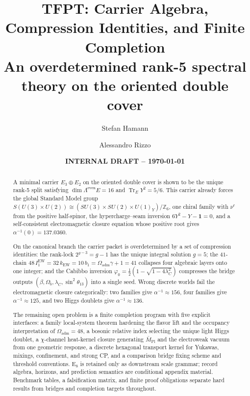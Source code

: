 \documentclass[11pt,a4paper]{article}
\title{%
    \textbf{TFPT: Carrier Algebra, Compression Identities, and Finite Completion}\\[0.5em]
    \Large An overdetermined rank-5 spectral theory on the oriented double cover
}
\author{Stefan Hamann \and Alessandro Rizzo}
\date{\textbf{INTERNAL DRAFT -- \today}}
\theoremstyle{definition}
\theoremstyle{remark}
\DeclareMathOperator{\tr}{Tr}
\begin{document}
\maketitle

\begin{abstract}
A minimal carrier $E_3\oplus E_2$ on the oriented double cover is shown to be the unique rank-5 split satisfying $\dim\Lambda^{\mathrm{even}}E=16$ and $\tr_EY^2=5/6$. This carrier already forces the global Standard Model group $S(U(3)\times U(2))\cong(SU(3)\times SU(2)\times U(1)_Y)/\mathbb Z_6$, one chiral family with $\nu^c$ from the positive half-spinor, the hypercharge--seam inversion $6Y^2-Y-\mathbf 1=0$, and a self-consistent electromagnetic closure equation whose positive root gives $\alpha^{-1}(0)=\num{137.0360}$.

On the canonical branch the carrier packet is overdetermined by a set of compression identities: the rank-lock $2^{g-3}=g-1$ has the unique integral solution $g=5$; the $41$-chain $48\,I_1^{\mathrm{EW}}=32\,k_{\mathrm{EW}}=10\,b_1=\Omega_{\mathrm{adm}}\gamma+1=41$ collapses four algebraic layers onto one integer; and the Cabibbo inversion $\varphi_0=\frac12(1-\sqrt{1-4\lambda_C^2})$ compresses the bridge outputs $(\beta,\Omega_b,\lambda_C,\sin^2\theta_{13})$ into a single seed. Wrong discrete worlds fail the electromagnetic closure categorically: two families give $\alpha^{-1}\approx 156$, four families give $\alpha^{-1}\approx 125$, and two Higgs doublets give $\alpha^{-1}\approx 136$.

The remaining open problem is a finite completion program with five explicit interfaces: a family local-system theorem hardening the flavor lift and the occupancy interpretation of $\Omega_{\mathrm{adm}}=48$, a bosonic relative index selecting the unique light Higgs doublet, a $\chi$-channel heat-kernel closure generating $\bar M_{\mathrm{Pl}}$ and the electroweak vacuum from one geometric response, a discrete hexagonal transport kernel for Yukawas, mixings, confinement, and strong CP, and a comparison bridge fixing scheme and threshold conventions. E$_8$ is retained only as downstream scale grammar; record algebra, horizons, and prediction semantics are conditional appendix material. Benchmark tables, a falsification matrix, and finite proof obligations separate hard results from bridges and completion targets throughout.
\end{abstract}
\end{document}
